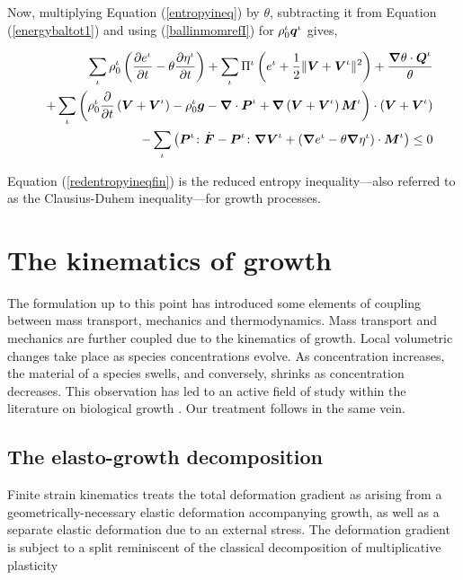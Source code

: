 Now, multiplying Equation (\ref{entropyineq}) by $\theta$,
subtracting it from Equation (\ref{energybaltot1}) and using
(\ref{ballinmomrefI}) for $\rho_0^\iota\mbox{\boldmath$ q$}^\iota$ gives,

\begin{eqnarray}
& &\sum\limits_{\iota}\rho^\iota_0\left(\frac{\partial
e^\iota}{\partial t} -\theta\frac{\partial\eta^\iota}{\partial
t}\right) +\sum\limits_{\iota}\Pi^\iota\left(e^\iota +
\frac{1}{2}\Vert\mbox{\boldmath$ V$}+\mbox{\boldmath$ V$}^\iota\Vert^2\right) +
\frac{\mbox{\boldmath$\nabla$}\theta\cdot\mbox{\boldmath$ Q$}^\iota}{\theta}
\nonumber\\
& &+\sum\limits_{\iota} \left(\rho^\iota_0\frac{\partial}{\partial
t}\left(\mbox{\boldmath$ V$}+\mbox{\boldmath$ V$}^\iota\right) - \rho_0^\iota\mbox{\boldmath$ g$} -
\mbox{\boldmath$\nabla$}\cdot\mbox{\boldmath$ P$}^\iota +
\mbox{\boldmath$\nabla$}\left(\mbox{\boldmath$ V$}+\mbox{\boldmath$ V$}^\iota\right)\mbox{\boldmath$ M$}^\iota\right)\cdot\left(\mbox{\boldmath$ V$}+\mbox{\boldmath$ V$}^\iota\right)
\nonumber\\
& &-\sum\limits_{\iota}\left(\mbox{\boldmath$ P$}^\iota\colon\dot{\mbox{\boldmath$ F$}} -
\mbox{\boldmath$ P$}^\iota\colon\mbox{\boldmath$\nabla$}\mbox{\boldmath$ V$}^\iota + \left(\mbox{\boldmath$\nabla$} e^\iota -
\theta\mbox{\boldmath$\nabla$}\eta^\iota\right) \cdot\mbox{\boldmath$ M$}^\iota\right)\leq 0
\label{redentropyineqfin}
\end{eqnarray}

\noindent Equation (\ref{redentropyineqfin}) is the reduced
entropy inequality---also referred to as the Clausius-Duhem
inequality---for growth processes.

\section{The kinematics of growth}\label{sect3bis}

The formulation up to this point has introduced some elements of
coupling between mass transport, mechanics and thermodynamics.
Mass transport and mechanics are further coupled due to the
kinematics of growth. Local volumetric changes take place as
species concentrations evolve. As concentration increases, the
material of a species swells, and conversely, shrinks as
concentration decreases. This observation has led to an active
field of study within the literature on biological growth
\citep{Skalak:81,SkalakHoger:96,TaberHumphrey:2001,LubardaHoger:02,AmbrosiMollica:2002}.
Our treatment follows in the same vein.

\subsection{The elasto-growth decomposition}\label{sect3bis.1}

Finite strain kinematics treats the total deformation gradient as
arising from a geometrically-necessary elastic deformation
accompanying growth, as well as a separate elastic deformation due
to an external stress. The deformation gradient is subject to a
split reminiscent of the classical decomposition of multiplicative
plasticity \citep{Bilbyetal:1957,Lee:1969}

